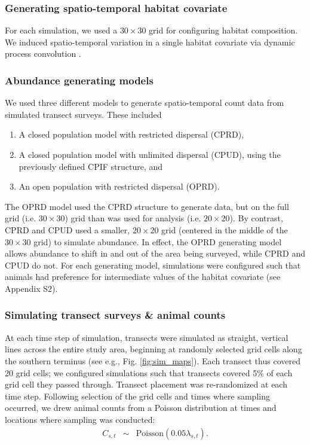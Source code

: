 \documentclass[12pt,english]{article}
\begin{document}
\begin{spacing}{1.9}
\subsubsection{Generating spatio-temporal habitat covariate}

For each simulation, we used a $30 \times 30$ grid for configuring habitat composition.  We induced spatio-temporal variation in a single habitat covariate via dynamic process convolution \citep[][; e.g., Fig. \ref{fig:sim_maps}]{CalderEtAl2002}.

\subsubsection{Abundance generating models}

We used three different models to generate spatio-temporal count data from simulated transect surveys.  These included
\begin{enumerate}
   \item  A closed population model with restricted dispersal (CPRD),
   \item A closed population model with unlimited dispersal (CPUD), using the previously defined CPIF structure, and
   \item An open population with restricted dispersal (OPRD).
\end{enumerate}
The OPRD model used the CPRD structure to generate data, but on the full grid (i.e. $30 \times 30$) grid than was used for analysis (i.e. $20 \times 20$).  By contrast, CPRD and CPUD used a smaller, $20 \times 20$ grid (centered in the middle of the $30 \times 30$ grid) to simulate abundance.  In effect, the OPRD generating model allows abundance to shift in and out of the area being surveyed, while CPRD and CPUD do not.  For each generating model, simulations were configured such that animals had preference for intermediate values of the habitat covariate (see Appendix S2).

\subsubsection{Simulating transect surveys \& animal counts}

At each time step of simulation, transects were simulated as straight, vertical lines across the entire study area, beginning at randomly selected grid cells along the southern terminus (see e.g., Fig. \ref{fig:sim_maps}).  Each transect thus covered 20 grid cells; we configured simulations such that transects covered 5\% of each grid cell they passed through.  Transect placement was re-randomized at each time step.  Following selection of the grid cells and times where sampling occurred, we drew animal counts from a Poisson distribution at times and locations where sampling was conducted:
\begin{eqnarray*}
  C_{s,t} & \sim & \text{Poisson}(0.05 \lambda_{s,t}).
\end{eqnarray*}


\end{spacing}
\end{document}
